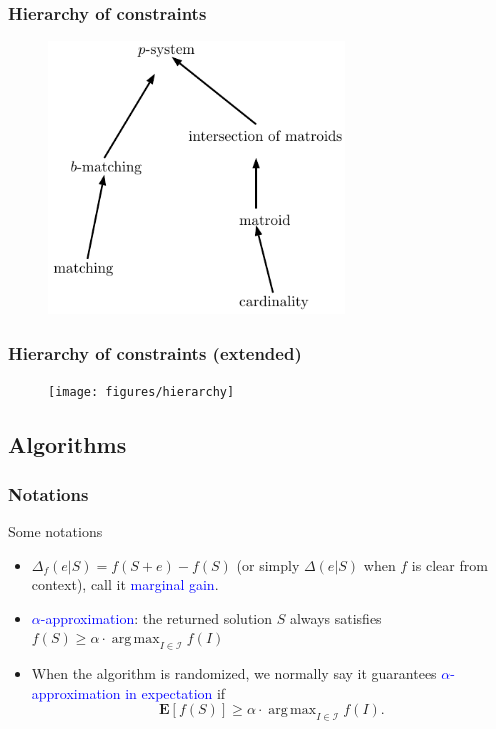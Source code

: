 \documentclass{beamer}
\newcommand{\calI}{\mathcal{I}}
\newcommand{\E}{\mathbf{E}}
\newcommand{\emRed}[1][]{\textcolor{blue} #1}
\DeclareMathOperator*{\argmax}{arg\,max}
\begin{document}
\begin{frame}
  \frametitle{Hierarchy of constraints}
  \begin{figure}[!ht]
    \centering
    \includegraphics[width=0.7\textwidth]{figures/hh}
  \end{figure}
\end{frame}


\begin{frame}
  \frametitle{Hierarchy of constraints (extended)}
  \begin{figure}[!ht]
    \centering
    \texttt{[image: figures/hierarchy]}
  \end{figure}
\end{frame}





\subsection{Algorithms}

\begin{frame}
  \frametitle{Notations}
  \begin{block}{Some notations}
    \begin{itemize}
      \item $\Delta_f(e|S) = f(S + e) - f(S)$ (or simply $\Delta(e|S)$ when $f$ is clear from context), call it \emRed{marginal gain}.
      \item \emRed{$\alpha$-approximation}: the returned solution $S$ always satisfies  $f(S) \geq \alpha \cdot \argmax_{I\in\calI}f(I)$
      \item When the algorithm is randomized, we normally say it guarantees \emRed{$\alpha$-approximation in expectation} if $$\E[f(S)] \geq \alpha\cdot \argmax_{I\in\calI}f(I).$$ 
    \end{itemize}
  \end{block}
\end{frame}
\end{document}
